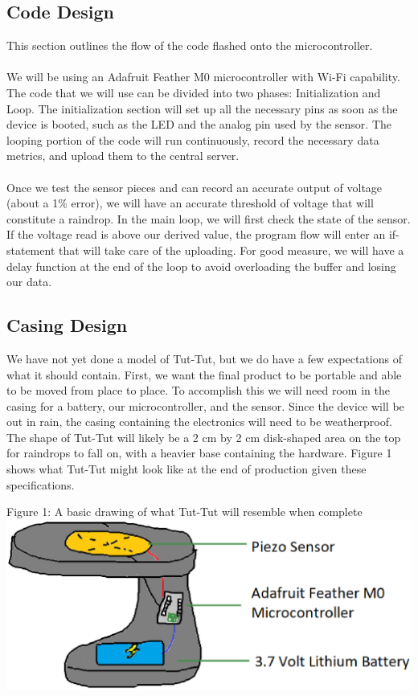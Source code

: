 \documentclass[letterpaper,10pt,draftclsnofoot,onecolumn]{article}
\begin{document}
\subsection{Code Design}
This section outlines the flow of the code flashed onto the microcontroller. 
\\
\\
We will be using an Adafruit Feather M0 microcontroller with Wi-Fi capability. The code that we will use can be divided into two phases: Initialization and Loop. The initialization section will set up all the necessary pins as soon as the device is booted, such as the LED and the analog pin used by the sensor. The looping portion of the code will run continuously, record the necessary data metrics, and upload them to the central server.
\\
\\
Once we test the sensor pieces and can record an accurate output of voltage (about a 1\% error), we will have an accurate threshold of voltage that will constitute a raindrop. In the main loop, we will first check the state of the sensor. If the voltage read is above our derived value, the program flow will enter an if-statement that will take care of the uploading. For good measure, we will have a delay function at the end of the loop to avoid overloading the buffer and losing our data.\cite{Knock} 

\subsection{Casing Design}
We have not yet done a model of Tut-Tut, but we do have a few expectations of what it should contain. First, we want the final product to be portable and able to be moved from place to place. To accomplish this we will need room in the casing for a battery, our microcontroller, and the sensor. Since the device will be out in rain, the casing containing the electronics will need to be weatherproof. The shape of Tut-Tut will likely be a 2 cm by 2 cm disk-shaped area on the top for raindrops to fall on, with a heavier base containing the hardware. Figure 1 shows what Tut-Tut might look like at the end of production given these specifications.
\newline

\begin{center}
Figure 1: A basic drawing of what Tut-Tut will resemble when complete
\includegraphics[width=.8\textwidth]{TutTutFirstDraft.eps}
\end{center}
\end{document}
